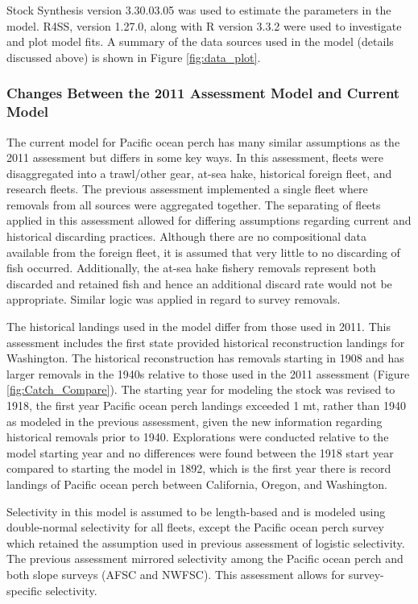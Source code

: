 \documentclass[12pt,]{article}
\begin{document}
Stock Synthesis version 3.30.03.05 was used to estimate the parameters
in the model. R4SS, version 1.27.0, along with R version 3.3.2 were used
to investigate and plot model fits. A summary of the data sources used
in the model (details discussed above) is shown in Figure
\ref{fig:data_plot}.

\subsubsection{Changes Between the 2011 Assessment Model and Current
Model}\label{changes-between-the-2011-assessment-model-and-current-model}

The current model for Pacific ocean perch has many similar assumptions
as the 2011 assessment but differs in some key ways. In this assessment,
fleets were disaggregated into a trawl/other gear, at-sea hake,
historical foreign fleet, and research fleets. The previous assessment
implemented a single fleet where removals from all sources were
aggregated together. The separating of fleets applied in this assessment
allowed for differing assumptions regarding current and historical
discarding practices. Although there are no compositional data available
from the foreign fleet, it is assumed that very little to no discarding
of fish occurred. Additionally, the at-sea hake fishery removals
represent both discarded and retained fish and hence an additional
discard rate would not be appropriate. Similar logic was applied in
regard to survey removals.

The historical landings used in the model differ from those used in
2011. This assessment includes the first state provided historical
reconstruction landings for Washington. The historical reconstruction
has removals starting in 1908 and has larger removals in the 1940s
relative to those used in the 2011 assessment (Figure
\ref{fig:Catch_Compare}). The starting year for modeling the stock was
revised to 1918, the first year Pacific ocean perch landings exceeded 1
mt, rather than 1940 as modeled in the previous assessment, given the
new information regarding historical removals prior to 1940.
Explorations were conducted relative to the model starting year and no
differences were found between the 1918 start year compared to starting
the model in 1892, which is the first year there is record landings of
Pacific ocean perch between California, Oregon, and Washington.

Selectivity in this model is assumed to be length-based and is modeled
using double-normal selectivity for all fleets, except the Pacific ocean
perch survey which retained the assumption used in previous assessment
of logistic selectivity. The previous assessment mirrored selectivity
among the Pacific ocean perch and both slope surveys (AFSC and NWFSC).
This assessment allows for survey-specific selectivity.
\end{document}
